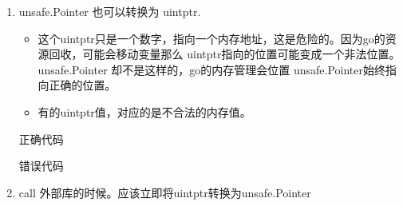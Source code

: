 \begin{enumerate}
\item
  unsafe.Pointer 也可以转换为 uintptr.

  \begin{itemize}
  \tightlist
  \item
    这个uintptr只是一个数字，指向一个内存地址，这是危险的。因为go的资源回收，可能会移动变量那么
    uintptr指向的位置可能变成一个非法位置。unsafe.Pointer
    却不是这样的，go的内存管理会位置 unsafe.Pointer始终指向正确的位置。
  \item
    有的uintptr值，对应的是不合法的内存值。
  \end{itemize}

  正确代码

\begin{Shaded}
\begin{Highlighting}[]
\NormalTok{ \{}
\NormalTok{ \}}
\end{Highlighting}
\end{Shaded}

  错误代码

\begin{Shaded}
\begin{Highlighting}[]
\CommentTok{// }
\end{Highlighting}
\end{Shaded}

\begin{Shaded}
\begin{Highlighting}[]
\CommentTok{// }
\end{Highlighting}
\end{Shaded}
\item
  call 外部库的时候。应该立即将uintptr转换为unsafe.Pointer


\end{enumerate}
